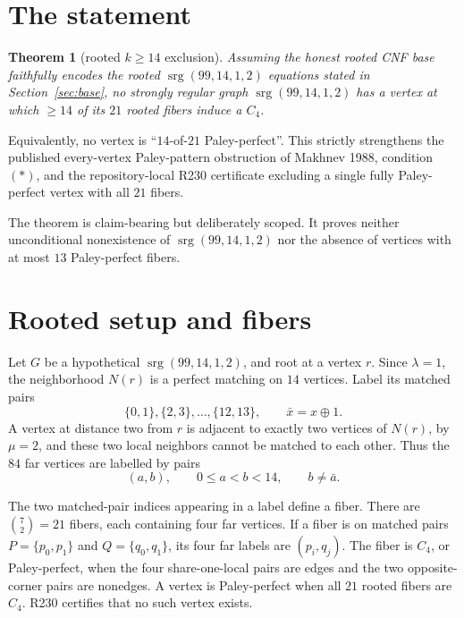 \documentclass[11pt]{article}
\newtheorem{theorem}{Theorem}
\newcommand{\srg}{\operatorname{srg}}
\begin{document}
\section{The statement}

\begin{theorem}[rooted \(k \geq 14\) exclusion]
\label{thm:k14}
Assuming the honest rooted CNF base faithfully encodes the rooted
\(\srg(99,14,1,2)\) equations stated in Section~\ref{sec:base}, no strongly
regular graph \(\srg(99,14,1,2)\) has a vertex at which \(\geq 14\) of its
\(21\) rooted fibers induce a \(C_4\).
\end{theorem}

Equivalently, no vertex is ``\(14\)-of-\(21\) Paley-perfect''.  This strictly
strengthens the published every-vertex Paley-pattern obstruction of Makhnev
1988, condition \((*)\), and the repository-local R230 certificate excluding a
single fully Paley-perfect vertex with all \(21\) fibers.

The theorem is claim-bearing but deliberately scoped.  It proves neither
unconditional nonexistence of \(\srg(99,14,1,2)\) nor the absence of vertices
with at most \(13\) Paley-perfect fibers.

\section{Rooted setup and fibers}
\label{sec:setup}

Let \(G\) be a hypothetical \(\srg(99,14,1,2)\), and root at a vertex \(r\).
Since \(\lambda=1\), the neighborhood \(N(r)\) is a perfect matching on
\(14\) vertices.  Label its matched pairs
\[
  \{0,1\},\{2,3\},\ldots,\{12,13\}, \qquad \bar x=x\oplus 1.
\]
A vertex at distance two from \(r\) is adjacent to exactly two vertices of
\(N(r)\), by \(\mu=2\), and these two local neighbors cannot be matched to
each other.  Thus the \(84\) far vertices are labelled by pairs
\[
  (a,b), \qquad 0\leq a<b<14,\qquad b\neq \bar a.
\]

The two matched-pair indices appearing in a label define a fiber.  There are
\(\binom 72=21\) fibers, each containing four far vertices.  If a fiber is on
matched pairs \(P=\{p_0,p_1\}\) and \(Q=\{q_0,q_1\}\), its four far labels are
\((p_i,q_j)\).  The fiber is \(C_4\), or Paley-perfect, when the four
share-one-local pairs are edges and the two opposite-corner pairs are nonedges.
A vertex is Paley-perfect when all \(21\) rooted fibers are \(C_4\).  R230
certifies that no such vertex exists.
\end{document}
